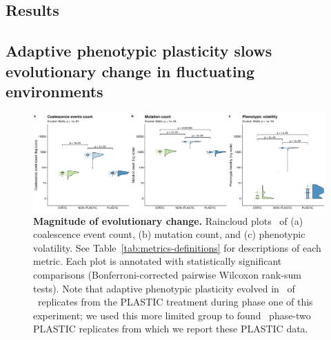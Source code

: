 \documentclass[utf8]{frontiersSCNS} %
\begin{document}
\begin{raggedbottom}

\section{Results}

\subsection{Adaptive phenotypic plasticity slows evolutionary change in fluctuating environments}

\begin{figure}[h!]
  \centering
  \includegraphics[width=1\textwidth]{media-evolutionary-change-magnitude-panel.pdf}
  \caption{\small
  \textbf{Magnitude of evolutionary change.}
  Raincloud plots~\citep{allen_raincloud_2019} of
  (a) coalescence event count,
  (b) mutation count,
  and (c) phenotypic volatility.
  See Table~\ref{tab:metrics-definitions} for descriptions of each metric.
  Each plot is annotated with statistically significant comparisons (Bonferroni-corrected pairwise Wilcoxon rank-sum tests).
  Note that adaptive phenotypic plasticity evolved in \evolutionaryChangeRatePlasticReps\ of \evolutionaryChangeRateReplicates\ replicates from the PLASTIC treatment during phase one of this experiment; we used this more limited group to found \evolutionaryChangeRatePlasticReps\ phase-two PLASTIC replicates from which we report these PLASTIC data.
  }
  \label{fig:evolutionary-dynamics-magnitude}
\end{figure}




\end{raggedbottom}
\end{document}
